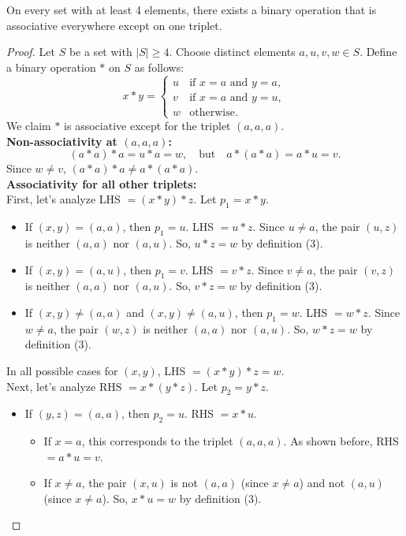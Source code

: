 \documentclass[sigconf]{acmart}
\begin{document}
\begin{theorem}
On every set with at least 4 elements, there exists a binary operation that is associative everywhere except on one triplet.
\end{theorem}
\begin{proof}
Let \( S \) be a set with \( |S| \geq 4 \). Choose distinct elements \( a, u, v, w \in S \). Define a binary operation \( * \) on \( S \) as follows:
\[
x * y =
\begin{cases}
u & \text{if } x = a \text{ and } y = a, \\
v & \text{if } x = a \text{ and } y = u, \\
w & \text{otherwise}.
\end{cases}
\]
We claim \( * \) is associative except for the triplet \( (a, a, a) \).
\\
\textbf{Non-associativity at \( (a, a, a) \):}
\[
(a * a) * a = u * a = w, \quad \text{but} \quad a * (a * a) = a * u = v.
\]
Since \( w \neq v \), \( (a * a) * a \neq a * (a * a) \).
\\
\textbf{Associativity for all other triplets:}
\\
First, let's analyze LHS $=(x \ast y) \ast z$. Let $p_1 = x \ast y$.
\begin{itemize}
    \item If $(x,y) = (a,a)$, then $p_1 = u$. LHS $= u \ast z$.
    Since $u \neq a$, the pair $(u,z)$ is neither $(a,a)$ nor $(a,u)$. So, $u \ast z = w$ by definition (3).
    \item If $(x,y) = (a,u)$, then $p_1 = v$. LHS $= v \ast z$.
    Since $v \neq a$, the pair $(v,z)$ is neither $(a,a)$ nor $(a,u)$. So, $v \ast z = w$ by definition (3).
    \item If $(x,y) \neq (a,a)$ and $(x,y) \neq (a,u)$, then $p_1 = w$. LHS $= w \ast z$.
    Since $w \neq a$, the pair $(w,z)$ is neither $(a,a)$ nor $(a,u)$. So, $w \ast z = w$ by definition (3).
\end{itemize}
In all possible cases for $(x,y)$, LHS $=(x \ast y) \ast z = w$.
\\
Next, let's analyze RHS $= x \ast (y \ast z)$. Let $p_2 = y \ast z$.
\begin{itemize}
    \item If $(y,z) = (a,a)$, then $p_2 = u$. RHS $= x \ast u$.
    \begin{itemize}
        \item If $x = a$, this corresponds to the triplet $(a,a,a)$. As shown before, RHS $= a \ast u = v$.
        \item If $x \neq a$, the pair $(x,u)$ is not $(a,a)$ (since $x \neq a$) and not $(a,u)$ (since $x \neq a$). So, $x \ast u = w$ by definition (3).

\end{itemize}
\end{itemize}
\end{proof}
\end{document}
